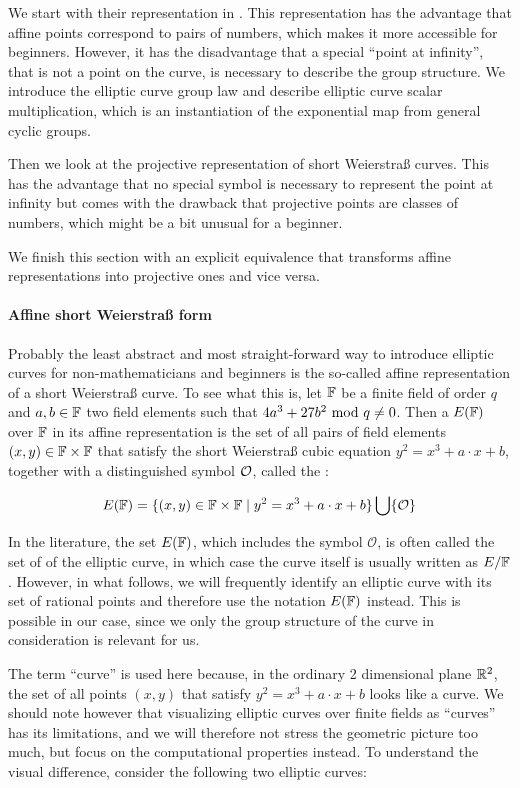 We start with their representation in . This representation has the advantage that affine points correspond to pairs of numbers, which makes it more accessible for beginners. However, it has the disadvantage that a special ``point at infinity'', that is not a point on the curve, is necessary to describe the group structure. We introduce the elliptic curve group law and describe elliptic curve scalar multiplication, which is an instantiation of the exponential map from general cyclic groups.

Then we look at the projective representation of short Weierstraß curves. This has the advantage that no special symbol is necessary to represent the point at infinity but comes with the drawback that projective points are classes of numbers, which might be a bit unusual for a beginner.

We finish this section with an explicit equivalence that transforms affine representations into projective ones and vice versa.

\paragraph{Affine short Weierstraß form} Probably the least abstract and most straight-forward way to introduce elliptic curves for non-mathematicians and beginners is the so-called affine representation of a short Weierstraß curve. To see what this is, let $\mathbb{F}$ be a finite field of order $q$ and $a,b\in \mathbb{F}$ two field elements such that $4a^3+ 27b^2 \text{ mod } q\neq 0$. Then a  $E(\mathbb{F})$ over $\mathbb{F}$ in its affine representation is the set of all pairs of field elements $(x,y)\in \mathbb{F}\times \mathbb{F}$ that satisfy the short Weierstraß cubic equation $y^2=x^3+a\cdot x+b$, together with a distinguished symbol $\mathcal{O}$, called the :

\begin{equation}
\label{def_short_weierstrass_curve}
E(\mathbb{F}) = \{(x,y)\in \mathbb{F}\times \mathbb{F}\;|\; y^2=x^3+a\cdot x+b \} \bigcup \{\mathcal{O}\}
\end{equation}
\begin{notation}
In the literature, the set $E(\mathbb{F})$, which includes the symbol $\mathcal{O}$, is often called the set of  of the elliptic curve, in which case the curve itself is usually written as $E/\mathbb{F}$. However, in what follows, we will frequently identify an elliptic curve with its set of rational points and therefore use the notation $E(\mathbb{F})$ instead. This is possible in our case, since we only the group structure of the curve in consideration is relevant for us.
\end{notation}
The term ``curve'' is used here because, in the ordinary 2 dimensional plane $\mathbb{R}^2$,
the set of all points $(x,y)$ that satisfy $y^2 = x^3 +a\cdot x +b$ looks like a curve. We should note however that visualizing elliptic curves over finite fields as ``curves'' has its limitations, and we will therefore not stress the geometric picture too much, but focus on the computational properties instead. To understand the visual difference, consider the following two elliptic curves: 


